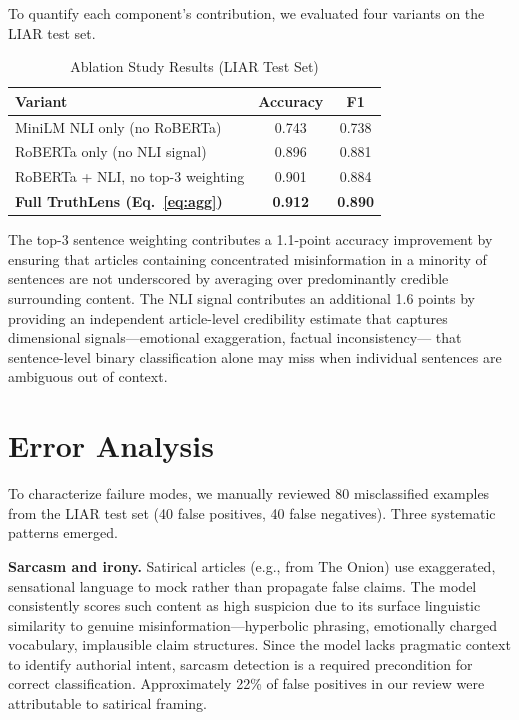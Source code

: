 \documentclass[journal]{IEEEtran}
\begin{document}
To quantify each component's contribution, we evaluated four variants on the LIAR test set.

\begin{table}[htbp]
\caption{Ablation Study Results (LIAR Test Set)}
\label{tab:ablation}
\centering
\begin{tabular}{lcc}
\toprule
\textbf{Variant} & \textbf{Accuracy} & \textbf{F1} \\
\midrule
MiniLM NLI only (no RoBERTa)      & 0.743 & 0.738 \\
RoBERTa only (no NLI signal)       & 0.896 & 0.881 \\
RoBERTa + NLI, no top-3 weighting  & 0.901 & 0.884 \\
\textbf{Full TruthLens (Eq.~\ref{eq:agg})} & \textbf{0.912} & \textbf{0.890} \\
\bottomrule
\end{tabular}
\end{table}

The top-3 sentence weighting contributes a 1.1-point accuracy improvement by ensuring that
articles containing concentrated misinformation in a minority of sentences are not
underscored by averaging over predominantly credible surrounding content. The NLI signal
contributes an additional 1.6 points by providing an independent article-level credibility
estimate that captures dimensional signals—emotional exaggeration, factual inconsistency—
that sentence-level binary classification alone may miss when individual sentences are
ambiguous out of context.

\section{Error Analysis}
\label{sec:error}

To characterize failure modes, we manually reviewed 80 misclassified examples from the
LIAR test set (40 false positives, 40 false negatives). Three systematic patterns emerged.

\textbf{Sarcasm and irony.} Satirical articles (e.g., from The Onion) use exaggerated,
sensational language to mock rather than propagate false claims. The model consistently
scores such content as high suspicion due to its surface linguistic similarity to genuine
misinformation—hyperbolic phrasing, emotionally charged vocabulary, implausible claim
structures. Since the model lacks pragmatic context to identify authorial intent, sarcasm
detection is a required precondition for correct classification. Approximately 22\% of false
positives in our review were attributable to satirical framing.
\end{document}
